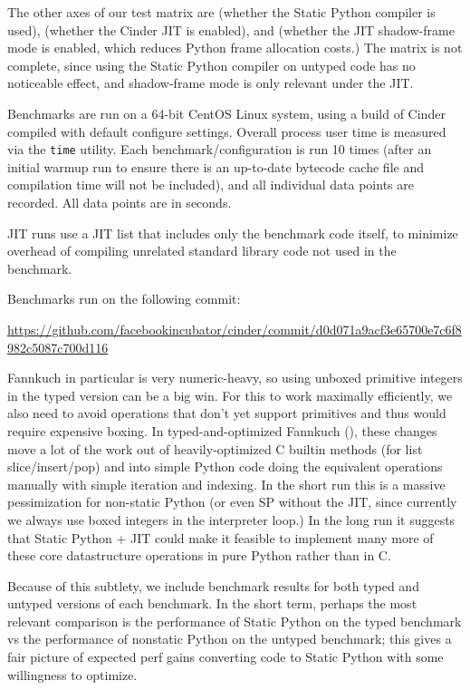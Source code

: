 \documentclass[english,cleveref,submission]{programming}
\newcommand{\code}[1]{\texttt{#1}}
\begin{document}
The other axes of our test matrix are  (whether the Static Python compiler is
used),  (whether the Cinder JIT is enabled), and  (whether the JIT
shadow-frame mode is enabled, which reduces Python frame allocation costs.) The
matrix is not complete, since using the Static Python compiler on untyped code
has no noticeable effect, and shadow-frame mode is only relevant under the JIT.

Benchmarks are run on a 64-bit CentOS Linux system, using a build of Cinder
compiled with default configure settings. Overall process user time is measured
via the \code{time} utility. Each benchmark/configuration is run 10 times (after an
initial warmup run to ensure there is an up-to-date bytecode cache file and
compilation time will not be included), and all individual data points are
recorded. All data points are in seconds.

JIT runs use a JIT list that includes only the benchmark code itself, to
minimize overhead of compiling unrelated standard library code not used in the
benchmark.

Benchmarks run on the following commit:

\smallskip
{\centering\footnotesize\url{https://github.com/facebookincubator/cinder/commit/d0d071a9acf3e65700e7c6f8982c5087c700d116}}

Fannkuch in particular is very numeric-heavy, so using unboxed primitive
integers in the typed version can be a big win. For this to work maximally
efficiently, we also need to avoid operations that don't yet support primitives
and thus would require expensive boxing. In typed-and-optimized Fannkuch (), these changes move
a lot of the work out of heavily-optimized C builtin methods (for list
slice/insert/pop) and into simple Python code doing the equivalent operations
manually with simple iteration and indexing. In the short run this is a massive
pessimization for non-static Python (or even SP without the JIT, since
currently we always use boxed integers in the interpreter loop.) In the long
run it suggests that Static Python + JIT could make it feasible to implement
many more of these core datastructure operations in pure Python rather than in
C.

Because of this subtlety, we include benchmark results for both typed and
untyped versions of each benchmark. In the short term, perhaps the most
relevant comparison is the performance of Static Python on the typed benchmark
vs the performance of nonstatic Python on the untyped benchmark; this gives a
fair picture of expected perf gains converting code to Static Python with some
willingness to optimize.
\end{document}
